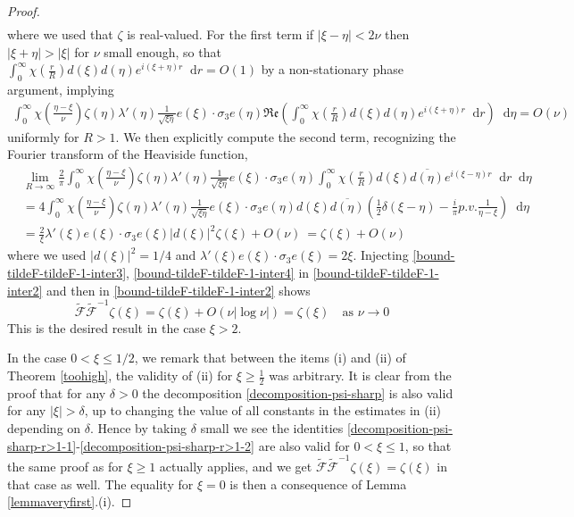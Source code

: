 \documentclass[11 pt]{amsart}
\theoremstyle{definition}
\theoremstyle{remark}
\numberwithin{equation}{section}
\newcommand{\dd}{\mathop{}\!\mathrm{d}}
\begin{document}
\begin{proof}
\begin{align}
\end{align}
where we used that $\zeta$ is real-valued. For the first term if $|\xi-\eta|<2\nu$ then $|\xi+\eta|>|\xi|$ for $\nu$ small enough, so that $ \int_0^\infty \chi \left( \frac{r}{R} \right) d(\xi)d(\eta)e^{i(\xi+\eta)r}\dd r=O(1)$ by a non-stationary phase argument, implying
\begin{align}  \label{bound-tildeF-tildeF-1-inter3} 
 \int_{0}^\infty \chi (\frac{\eta-\xi}{\nu}) \zeta(\eta)  \lambda'(\eta) \frac{1}{\sqrt{\xi \eta}} e(\xi)\cdot \sigma_3 e(\eta) \mathfrak{Re} \left( \int_0^\infty \chi \left( \frac{r}{R} \right) d(\xi)d(\eta)e^{i(\xi+\eta)r}\dd r\right) \dd \eta =O(\nu)
\end{align}
uniformly for $R>1$. We then explicitly compute the second term, recognizing the Fourier transform of the Heaviside function,
\begin{align}
\nonumber & \lim_{R \to \infty} \frac{2}{\pi} \int_{0}^\infty \chi (\frac{\eta-\xi}{\nu}) \zeta(\eta)  \lambda'(\eta) \frac{1}{\sqrt{\xi \eta}} e(\xi)\cdot \sigma_3 e(\eta) \int_0^\infty \chi \left( \frac{r}{R} \right)  d(\xi)\overline{d(\eta)}e^{i(\xi-\eta)r} \dd r  \dd \eta  \\
\nonumber &= 4 \int_{0}^\infty \chi (\frac{\eta-\xi}{\nu}) \zeta(\eta)  \lambda'(\eta)\frac{1}{\sqrt{\xi \eta}} e(\xi)\cdot \sigma_3 e(\eta) d(\xi)\overline{d(\eta)}\left(\frac{1}{2}\delta(\xi-\eta)-\frac{i}{\pi}p.v.\frac{1}{\eta-\xi} \right)\dd \eta  \\
\label{bound-tildeF-tildeF-1-inter4} &= \frac{2}{\xi}\lambda'(\xi)e(\xi)\cdot \sigma_3 e(\xi) |d(\xi)|^2  \zeta(\xi) +O(\nu)\ =  \zeta(\xi)+O(\nu)
\end{align}
where we used $|d(\xi)|^2=1/4$ and $\lambda'(\xi)e(\xi)\cdot \sigma_3 e(\xi)=2\xi$. Injecting \eqref{bound-tildeF-tildeF-1-inter3}, \eqref{bound-tildeF-tildeF-1-inter4} in \eqref{bound-tildeF-tildeF-1-inter2} and then in \eqref{bound-tildeF-tildeF-1-inter2} shows
$$
\widetilde{\mathcal F} \widetilde{\mathcal F}^{-1} \zeta (\xi) =\zeta(\xi)+O(\nu |\log\nu|) =\zeta(\xi) \quad \mbox{as $\nu \to 0$}
$$
This is the desired result in the case $\xi>2$.

In the case $0< \xi \leq 1/2$, we remark that between the items (i) and (ii) of Theorem \ref{toohigh}, the validity of (ii) for $\xi\geq \frac 12$ was arbitrary. It is clear from the proof that for any $\delta>0$ the decomposition \eqref{decomposition-psi-sharp} is also valid for any $|\xi|>\delta$, up to changing the value of all constants in the estimates in (ii) depending on $\delta$. Hence by taking $\delta$ small we see the identities \eqref{decomposition-psi-sharp-r>1-1}-\eqref{decomposition-psi-sharp-r>1-2} are also valid for $0<\xi\leq 1$, so that the same proof as for $\xi\geq 1$ actually applies, and we get $\widetilde{\mathcal F} \widetilde{\mathcal F}^{-1} \zeta (\xi) =\zeta(\xi)$ in that case as well. The equality for $\xi =0$ is then a consequence of Lemma \ref{lemmaveryfirst}.(i).
\end{proof}
\end{document}
